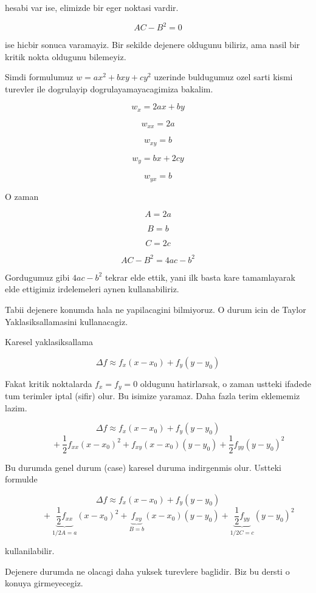 \documentclass[12pt,fleqn]{article}
\begin{document}
hesabi var ise, elimizde bir eger noktasi vardir. 

\[ AC - B^2 = 0 \]

ise hicbir sonuca varamayiz. Bir sekilde dejenere oldugunu biliriz, ama
nasil bir kritik nokta oldugunu bilemeyiz. 

Simdi formulumuz $w = ax^2 + bxy + cy^2$ uzerinde buldugumuz ozel sarti
kismi turevler ile dogrulayip dogrulayamayacagimiza bakalim. 

\[ w_{x} = 2ax + by\]

\[ w_{xx} = 2a\]

\[ w_{xy} = b\]

\[ w_{y} = bx + 2cy \]

\[ w_{yx} = b \]

O zaman

\[ A = 2a \]

\[ B = b \]

\[ C = 2c \]

\[ AC - B^2 = 4ac - b^2 \]

Gordugumuz gibi $4ac - b^2$ tekrar elde ettik, yani ilk basta kare
tamamlayarak elde ettigimiz irdelemeleri aynen kullanabiliriz. 

Tabii dejenere konumda hala ne yapilacagini bilmiyoruz. O durum icin de
Taylor Yaklasiksallamasini kullanacagiz. 

Karesel yaklasiksallama

\[ \Delta f \approx f_x (x - x_0) + f_y (y - y_0) \]

Fakat kritik noktalarda $f_x = f_y = 0$ oldugunu hatirlarsak, o zaman
ustteki ifadede tum terimler iptal (sifir) olur. Bu isimize yaramaz. Daha
fazla terim eklememiz lazim. 

\[ \Delta f \approx f_x (x - x_0) + f_y (y - y_0)   \]
\[\hspace{1cm}  + 
\frac{1}{2}f_{xx}(x-x_0)^2 + f_{xy}(x-x_0)(y-y_0) + 
\frac{1}{2}f_{yy}(y-y_0)^2 \]

Bu durumda genel durum (case) karesel duruma indirgenmis olur. Ustteki
formulde 

\[ \Delta f \approx f_x (x - x_0) + f_y (y - y_0)   \]
\[\hspace{1cm} + 
\underbrace{\frac{1}{2}f_{xx}}_{1/2 A = a}(x-x_0)^2 + 
\underbrace{f_{xy}}_{B=b}(x-x_0)(y-y_0) + 
\underbrace{\frac{1}{2}f_{yy}}_{1/2 C = c}(y-y_0)^2 \]

kullanilabilir. 

Dejenere durumda ne olacagi daha yuksek turevlere baglidir. Biz bu dersti o
konuya girmeyecegiz. 
\end{document}
